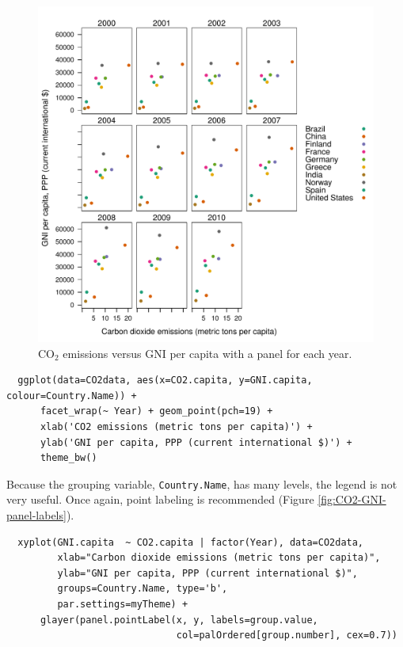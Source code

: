 \documentclass[smallroyalvopaper]{memoir}
\begin{document}
\begin{figure}[htbp]
\centering
\includegraphics[width=.9\linewidth]{figs/CO2_capita_panel.pdf}
\caption{\(\mathrm{CO_2}\) emissions versus GNI per capita with a panel for each year. \label{fig:CO2-GNI-panel}}
\end{figure}

\lstset{language=r,label= ,caption= ,captionpos=b,numbers=none}
\begin{lstlisting}
  ggplot(data=CO2data, aes(x=CO2.capita, y=GNI.capita, colour=Country.Name)) +
      facet_wrap(~ Year) + geom_point(pch=19) + 
      xlab('CO2 emissions (metric tons per capita)') +
      ylab('GNI per capita, PPP (current international $)') +
      theme_bw()
\end{lstlisting}

Because the grouping variable, \texttt{Country.Name}, has many levels, the
legend is not very useful. Once again, point labeling is recommended
(Figure \ref{fig:CO2-GNI-panel-labels}).

\lstset{language=r,label= ,caption= ,captionpos=b,numbers=none}
\begin{lstlisting}
  xyplot(GNI.capita  ~ CO2.capita | factor(Year), data=CO2data,
         xlab="Carbon dioxide emissions (metric tons per capita)",
         ylab="GNI per capita, PPP (current international $)",
         groups=Country.Name, type='b',
         par.settings=myTheme) + 
      glayer(panel.pointLabel(x, y, labels=group.value,
                              col=palOrdered[group.number], cex=0.7))
\end{lstlisting}
\end{document}
